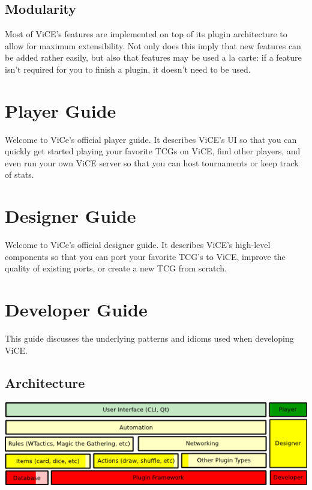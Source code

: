 \documentclass[letterpaper,10pt,english]{sphinxmanual}
\begin{document}
\chapter{Modularity}
\label{preface:modularity}
Most of ViCE's features are implemented on top
of its plugin architecture to allow for maximum extensibility. Not only does
this imply that new features can be added rather easily, but also that features
may be used a la carte: if a feature isn't required for you to finish a plugin,
it doesn't need to be used.


\part{Player Guide}
\label{player_guide/player_index:player-guide}\label{player_guide/player_index::doc}
Welcome to ViCe's official player guide. It describes ViCE's UI so that you
can quickly get started playing your favorite TCGs on ViCE, find other
players, and even run your own ViCE server so that you can host tournaments
or keep track of stats.


\part{Designer Guide}
\label{designer_guide/designer_index:designer-guide}\label{designer_guide/designer_index::doc}
Welcome to ViCe's official designer guide. It describes ViCE's high-level
components so that you can port your favorite TCG's to ViCE, improve
the quality of existing ports, or create a new TCG from scratch.


\part{Developer Guide}
\label{developer_guide/developer_index::doc}\label{developer_guide/developer_index:developer-guide}
This guide discusses the underlying patterns and idioms used when developing
ViCE.


\chapter{Architecture}
\label{developer_guide/architecture::doc}\label{developer_guide/architecture:architecture}
\includegraphics{stack_diagram.png}
\end{document}
